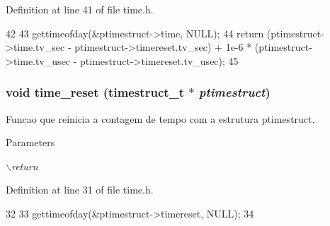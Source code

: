 Definition at line 41 of file time.h.


\begin{DoxyCode}
42 {
43         gettimeofday(&ptimestruct->time, NULL);
44         return (ptimestruct->time.tv_sec - ptimestruct->timereset.tv_sec) + 1e-6 
      * (ptimestruct->time.tv_usec - ptimestruct->timereset.tv_usec);
45 }                      
\end{DoxyCode}
\subsubsection[{time\_\-reset}]{\setlength{\rightskip}{0pt plus 5cm}void time\_\-reset ({\bf timestruct\_\-t} $\ast$ {\em ptimestruct})\hspace{0.3cm}{\ttfamily  [inline]}}\label{time_8h_adb1c3c3c760c930811ef574f86c8c701}
Funcao que reinicia a contagem de tempo com a estrutura ptimestruct. 
\begin{DoxyParams}{Parameters}
\item[{\em $\backslash$return}]\end{DoxyParams}


Definition at line 31 of file time.h.


\begin{DoxyCode}
32 {
33         gettimeofday(&ptimestruct->timereset, NULL);
34 }                      
\end{DoxyCode}
